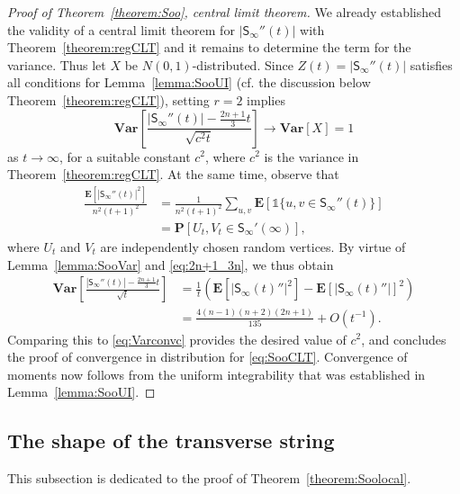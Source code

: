 \documentclass[a4paper,11pt,reqno]{amsart}
\newcommand{\bP}{\mathbf{P}}
\newcommand{\bE}{\mathbf{E}}
\newcommand{\bVar}{\mathbf{Var}}
\newcommand{\Soo}{\mathsf{S}_\infty}
\theoremstyle{definition}
\begin{document}
\begin{proof}[Proof of Theorem~\ref{theorem:Soo}, central limit theorem]
 We already established the validity of a central limit theorem for $|\Soo''(t)|$ with Theorem~\ref{theorem:regCLT} and it remains to determine the term for the variance. Thus let $X$ be $N(0,1)$-distributed. Since $Z(t)=|\Soo''(t)|$ satisfies all conditions for Lemma~\ref{lemma:SooUI} (cf. the discussion below Theorem~\ref{theorem:regCLT}), setting $r=2$ implies 
 \begin{equation}\label{eq:Varconvc}
  \bVar\left[\frac{|\Soo''(t)|-\frac{2n+1}{3}t}{\sqrt{c^2t}}\right] \to \bVar[X]=1
 \end{equation}
 as $t\to\infty$, for a suitable constant $c^2$, where $c^2$ is the variance in Theorem~\ref{theorem:regCLT}. At the same time, observe that 
 \begin{align*}
  \frac{\bE[|\Soo''(t)|^2]}{n^2(t+1)^2} 
   &= \frac{1}{n^2(t+1)^2}\sum_{u,v}\bE[\mathds{1}\{u,v\in\Soo''(t)\}]\\ 
   &= \bP[U_t,V_t\in\Soo'(\infty)],
 \end{align*}
 where $U_t$ and $V_t$ are independently chosen random vertices. By virtue of Lemma~\ref{lemma:SooVar} and \eqref{eq:2n+1_3n}, we thus obtain 
 \begin{align*}
  \bVar\left[\frac{|\Soo''(t)|-\frac{2n+1}{3}t}{\sqrt{t}}\right] 
  &= \frac{1}{t}\left(\bE[|\Soo(t)''|^2] - \bE[|\Soo(t)''|]^2\right) \\
  &= \frac{4(n-1)(n+2)(2n+1)}{135} + O(t^{-1}).
 \end{align*}
 Comparing this to \eqref{eq:Varconvc} provides the desired value of $c^2$, and concludes the proof of convergence in distribution for \eqref{eq:SooCLT}. Convergence of moments now follows from the uniform integrability that was established in Lemma~\ref{lemma:SooUI}.
\end{proof}





\subsection*{The shape of the transverse string} 
This subsection is dedicated to the proof of Theorem~\ref{theorem:Soolocal}. 
\end{document}
